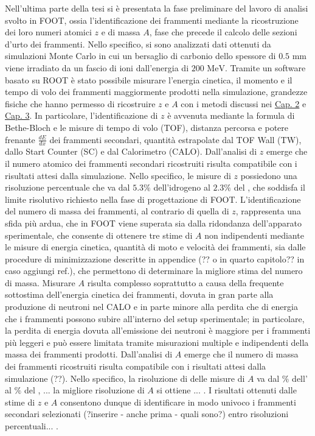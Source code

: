 \documentclass[12pt,a4paper,twoside]{report}
\begin{document}
	Nell'ultima parte della tesi si è presentata la fase preliminare del lavoro di analisi svolto in FOOT, ossia l'identificazione dei frammenti mediante la ricostruzione dei loro numeri atomici $z$ e di massa $A$, fase che precede il calcolo delle sezioni d'urto dei frammenti. Nello specifico, si sono analizzati dati ottenuti da simulazioni Monte Carlo in cui un bersaglio di carbonio  dello spessore di $0.5 \mbox{ mm}$ viene irradiato da un fascio di ioni  dall'energia di $200 \mbox{ MeV}$. Tramite un software basato su ROOT è stato possibile misurare l'energia cinetica, il momento e il tempo di volo dei frammenti maggiormente prodotti nella simulazione, grandezze fisiche che hanno permesso di ricostruire $z$ e $A$ con i metodi discussi nei \hyperref[cap:2]{Cap. 2} e \hyperref[cap:3]{Cap. 3}. In particolare, l'identificazione di $z$ è avvenuta mediante la formula di Bethe-Bloch e le misure di tempo di volo (TOF), distanza percorsa e potere frenante $\frac{dE}{dx}$ dei frammenti secondari, quantità estrapolate dal TOF Wall (TW), dallo Start Counter (SC) e dal Calorimetro (CALO). Dall'analisi di $z$ emerge che il numero atomico dei frammenti secondari ricostruiti risulta compatibile con i risultati attesi dalla simulazione. Nello specifico, le misure di $z$ possiedono una risoluzione percentuale che va dal $5.3\%$ dell'idrogeno  al $2.3\%$ del , che soddisfa il limite risolutivo richiesto nella fase di progettazione di FOOT. L'identificazione del numero di massa dei frammenti, al contrario di quella di $z$, rappresenta una sfida più ardua, che in FOOT viene superata sia dalla ridondanza dell'apparato sperimentale, che consente di ottenere tre stime di $A$ non indipendenti mediante le misure di energia cinetica, quantità di moto e velocità dei frammenti, sia dalle procedure di minimizzazione descritte in appendice (?? o in quarto capitolo?? in caso aggiungi ref.), che permettono di determinare la migliore stima del numero di massa. Misurare $A$ risulta complesso soprattutto a causa della frequente sottostima dell'energia cinetica dei frammenti, dovuta in gran parte alla produzione di neutroni nel CALO e in parte minore alla perdita che di energia che i frammenti possono subire all'interno del setup sperimentale; in particolare, la perdita di energia dovuta all'emissione dei neutroni è maggiore per i frammenti più leggeri e può essere limitata tramite misurazioni multiple e indipendenti della massa dei frammenti prodotti. Dall'analisi di $A$ emerge che il numero di massa dei frammenti ricostruiti risulta compatibile con i risultati attesi dalla simulazione (??). Nello specifico, la risoluzione di delle misure di $A$ va dal $\%$ dell' al $\%$ del , ... la migliore risoluzione di $A$ si ottiene ... . I risultati ottenuti dalle stime di $z$ e $A$ consentono dunque di identificare in modo univoco i frammenti secondari selezionati (?inserire - anche prima - quali sono?) entro risoluzioni percentuali... .
	\newpage
	\printbibliography[
		heading=bibintoc,
		title={Bibliografia}
		]
		
\end{document}
